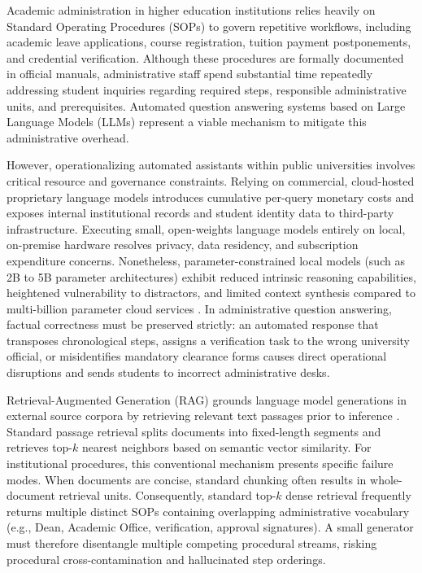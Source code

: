 \documentclass[preprint,10pt]{elsarticle}
\begin{document}
Academic administration in higher education institutions relies heavily on Standard Operating Procedures (SOPs) to govern repetitive workflows, including academic leave applications, course registration, tuition payment postponements, and credential verification. Although these procedures are formally documented in official manuals, administrative staff spend substantial time repeatedly addressing student inquiries regarding required steps, responsible administrative units, and prerequisites. Automated question answering systems based on Large Language Models (LLMs) represent a viable mechanism to mitigate this administrative overhead.

However, operationalizing automated assistants within public universities involves critical resource and governance constraints. Relying on commercial, cloud-hosted proprietary language models introduces cumulative per-query monetary costs and exposes internal institutional records and student identity data to third-party infrastructure. Executing small, open-weights language models entirely on local, on-premise hardware resolves privacy, data residency, and subscription expenditure concerns. Nonetheless, parameter-constrained local models (such as 2B to 5B parameter architectures) exhibit reduced intrinsic reasoning capabilities, heightened vulnerability to distractors, and limited context synthesis compared to multi-billion parameter cloud services \cite{liu2024lost}. In administrative question answering, factual correctness must be preserved strictly: an automated response that transposes chronological steps, assigns a verification task to the wrong university official, or misidentifies mandatory clearance forms causes direct operational disruptions and sends students to incorrect administrative desks.

Retrieval-Augmented Generation (RAG) grounds language model generations in external source corpora by retrieving relevant text passages prior to inference \cite{lewis2020rag,gao2023ragsurvey}. Standard passage retrieval splits documents into fixed-length segments and retrieves top-$k$ nearest neighbors based on semantic vector similarity. For institutional procedures, this conventional mechanism presents specific failure modes. When documents are concise, standard chunking often results in whole-document retrieval units. Consequently, standard top-$k$ dense retrieval frequently returns multiple distinct SOPs containing overlapping administrative vocabulary (e.g., Dean, Academic Office, verification, approval signatures). A small generator must therefore disentangle multiple competing procedural streams, risking procedural cross-contamination and hallucinated step orderings.
\end{document}
